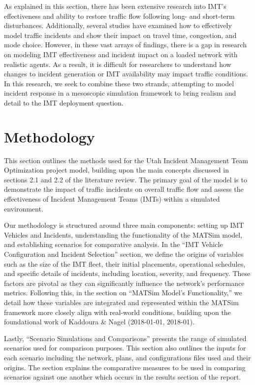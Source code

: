 \documentclass[fancy, oneside, mastersfancy, ms]{byuthesis}
\begin{document}
As explained in this section, there has been extensive research into
IMT's effectiveness and ability to restore traffic flow following long-
and short-term disturbances. Additionally, several studies have examined
how to effectively model traffic incidents and show their impact on
travel time, congestion, and mode choice. However, in these vast arrays
of findings, there is a gap in research on modeling IMT effectiveness
and incident impact on a loaded network with realistic agents. As a
result, it is difficult for researchers to understand how changes to
incident generation or IMT availability may impact traffic conditions.
In this research, we seek to combine these two strands, attempting to
model incident response in a mesoscopic simulation framework to bring
realism and detail to the IMT deployment question.


\hypertarget{methodology}{%
\chapter{Methodology}\label{methodology}}

This section outlines the methods used for the Utah Incident Management
Team Optimization project model, building upon the main concepts
discussed in sections 2.1 and 2.2 of the literature review. The primary
goal of the model is to demonstrate the impact of traffic incidents on
overall traffic flow and assess the effectiveness of Incident Management
Teams (IMTs) within a simulated environment.

Our methodology is structured around three main components: setting up
IMT Vehicles and Incidents, understanding the functionality of the
MATSim model, and establishing scenarios for comparative analysis. In
the ``IMT Vehicle Configuration and Incident Selection'' section, we
define the origins of variables such as the size of the IMT fleet, their
initial placements, operational schedules, and specific details of
incidents, including location, severity, and frequency. These factors
are pivotal as they can significantly influence the network's
performance metrics. Following this, in the section on ``MATSim Model's
Functionality,'' we detail how these variables are integrated and
represented within the MATSim framework more closely align with
real-world conditions, building upon the foundational work of Kaddoura
\& Nagel (2018-01-01, 2018-01).

Lastly, ``Scenario Simulations and Comparisons'' presents the range of
simulated scenarios used for comparison purposes. This section also
outlines the inputs for each scenario including the network, plans, and
configurations files used and their origins. The section explains the
comparative measures to be used in comparing scenarios against one
another which occurs in the results section of the report.
\end{document}
